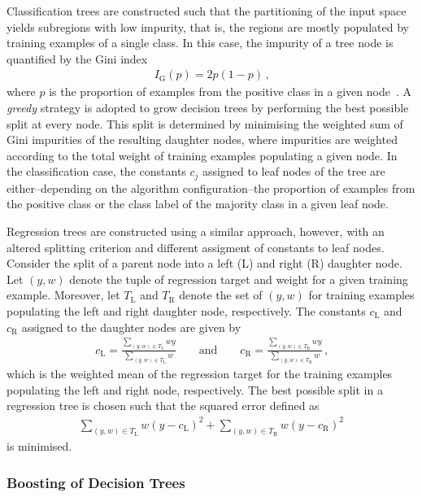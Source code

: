 Classification trees are constructed such that the partitioning of the input
space yields subregions with low impurity, that is, the regions are mostly
populated by training examples of a single class. In this case, the impurity of
a tree node is quantified by the Gini index
\begin{align*}
  I_{\text{G}}(p) = 2 p (1 - p) \,\text{,}
\end{align*}
where $p$ is the proportion of examples from the positive class in a given
node~\cite{hastie09}. A \emph{greedy} strategy is adopted to grow decision trees
by performing the best possible split at every node. This split is determined by
minimising the weighted sum of Gini impurities of the resulting daughter nodes,
where impurities are weighted according to the total weight of training examples
populating a given node. In the classification case, the constants $c_j$
assigned to leaf nodes of the tree are either--depending on the algorithm
configuration--the proportion of examples from the positive class or the class
label of the majority class in a given leaf node.

Regression trees are constructed using a similar approach, however, with an
altered splitting criterion and different assigment of constants to leaf
nodes. Consider the split of a parent node into a left (L) and right (R)
daughter node. Let $(y, w)$ denote the tuple of regression target and weight for
a given training example. Moreover, let $T_{\text{L}}$ and $T_{\text{R}}$ denote
the set of $(y, w)$ for training examples populating the left and right daughter
node, respectively. The constants $c_{\text{L}}$ and $c_{\text{R}}$ assigned to
the daughter nodes are given by
\begin{align*}
  c_{\text{L}} = \frac{\sum_{(y, w) \in T_{\text{L}}} w y}{\sum_{(y, w) \in T_{\text{L}}} w} \qquad \text{and} \qquad c_{\text{R}} = \frac{\sum_{(y, w) \in T_{\text{R}}} w y}{\sum_{(y, w) \in T_{\text{R}}} w} \,\text{,}
\end{align*}
which is the weighted mean of the regression target for the training examples
populating the left and right node, respectively. The best possible split in a
regression tree is chosen such that the squared error defined as
\begin{align*}
  \sum_{(y, w) \in T_{\text{L}}} w (y - c_{\text{L}})^2 + \sum_{(y, w) \in T_{\text{R}} } w (y - c_{\text{R}})^2
\end{align*}
is minimised.


\subsubsection{Boosting of Decision Trees}


